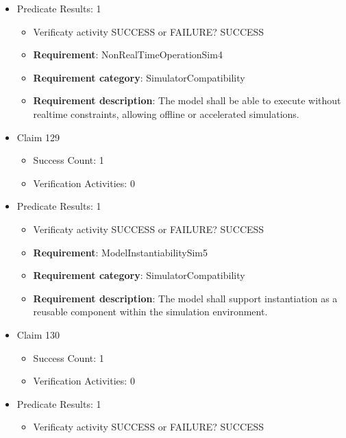 \documentclass{article}
\begin{document}
\begin{itemize}
									    
				\item Predicate Results: 1
					\begin{itemize}				
					\item Verificaty activity SUCCESS or FAILURE? SUCCESS
					
					\item \textbf{Requirement}: NonRealTimeOperationSim4 
					\item \textbf{Requirement category}: SimulatorCompatibility
					\item \textbf{Requirement description}: The model shall be able to execute without realtime constraints, allowing offline or accelerated simulations.
					\end{itemize}

  				  \item Claim 129
				\begin{itemize}
			    	\item Success Count: 1 
			    	\item Verification Activities: 0
				\end{itemize}
				
									    
				\item Predicate Results: 1
					\begin{itemize}				
					\item Verificaty activity SUCCESS or FAILURE? SUCCESS
					
					\item \textbf{Requirement}: ModelInstantiabilitySim5 
					\item \textbf{Requirement category}: SimulatorCompatibility
					\item \textbf{Requirement description}: The model shall support instantiation as a reusable component within the simulation environment.
					\end{itemize}

  				  \item Claim 130
				\begin{itemize}
			    	\item Success Count: 1 
			    	\item Verification Activities: 0
				\end{itemize}
				
									    
				\item Predicate Results: 1
					\begin{itemize}				
					\item Verificaty activity SUCCESS or FAILURE? SUCCESS
					

\end{itemize}
\end{itemize}
\end{document}
